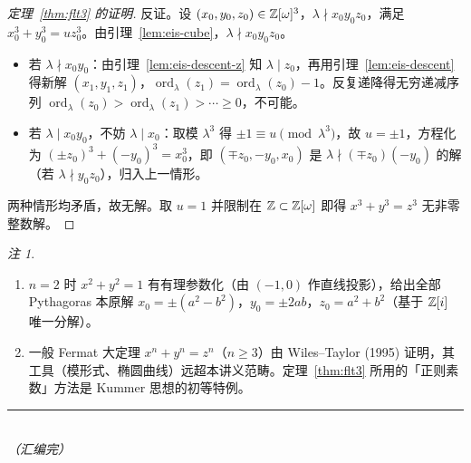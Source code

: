 \documentclass{article}
\newcommand{\ord}{\operatorname{ord}}
\theoremstyle{plain}
\theoremstyle{definition}
\theoremstyle{remark}
\newtheorem{rem}[thm]{注}
\begin{document}
\begin{proof}[定理~\ref{thm:flt3} 的证明]
  反证。设 $(x_0,y_0,z_0)\in\mathbb{Z}[\omega]^3$，$\lambda\nmid x_0y_0z_0$，满足 $x_0^3+y_0^3=uz_0^3$。由引理~\ref{lem:eis-cube}，$\lambda\nmid x_0y_0z_0$。
  \begin{itemize}
    \item 若 $\lambda\nmid x_0y_0$：由引理~\ref{lem:eis-descent-z} 知 $\lambda\mid z_0$，再用引理~\ref{lem:eis-descent} 得新解 $(x_1,y_1,z_1)$，$\ord_\lambda(z_1)=\ord_\lambda(z_0)-1$。反复递降得无穷递减序列 $\ord_\lambda(z_0)>\ord_\lambda(z_1)>\cdots\ge0$，不可能。
    \item 若 $\lambda\mid x_0y_0$，不妨 $\lambda\mid x_0$：取模 $\lambda^3$ 得 $\pm1\equiv u\pmod{\lambda^3}$，故 $u=\pm1$，方程化为 $(\pm z_0)^3+(-y_0)^3=x_0^3$，即 $(\mp z_0,-y_0,x_0)$ 是 $\lambda\nmid(\mp z_0)(-y_0)$ 的解（若 $\lambda\nmid y_0z_0$），归入上一情形。
  \end{itemize}
  两种情形均矛盾，故无解。取 $u=1$ 并限制在 $\mathbb{Z}\subset\mathbb{Z}[\omega]$ 即得 $x^3+y^3=z^3$ 无非零整数解。
\end{proof}

\begin{rem}
  \begin{enumerate}[(1)]
    \item $n=2$ 时 $x^2+y^2=1$ 有有理参数化（由 $(-1,0)$ 作直线投影），给出全部 Pythagoras 本原解 $x_0=\pm(a^2-b^2)$，$y_0=\pm2ab$，$z_0=a^2+b^2$（基于 $\mathbb{Z}[i]$ 唯一分解）。
    \item 一般 Fermat 大定理 $x^n+y^n=z^n$（$n\ge3$）由 Wiles--Taylor (1995) 证明，其工具（模形式、椭圆曲线）远超本讲义范畴。定理~\ref{thm:flt3} 所用的「正则素数」方法是 Kummer 思想的初等特例。
  \end{enumerate}
\end{rem}

\bigskip
\begin{center}
  \rule{0.4\textwidth}{0.4pt}\\[2pt]
  \itshape （汇编完）
\end{center}
\end{document}
